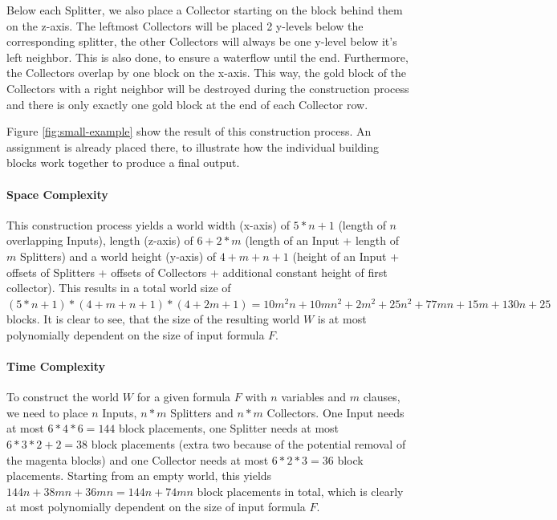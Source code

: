 \noindent Below each Splitter, we also place a Collector starting on the block behind them on the z-axis. The leftmost Collectors will be placed 2 y-levels below the corresponding splitter, the other Collectors will always be one y-level below it's left neighbor. This is also done, to ensure a waterflow until the end. Furthermore, the Collectors overlap by one block on the x-axis. This way, the gold block of the Collectors with a right neighbor will be destroyed during the construction process and there is only exactly one gold block at the end of each Collector row.
\linebreak

\noindent Figure \ref{fig:small-example} show the result of this construction process. An assignment is already placed there, to illustrate how the individual building blocks work together to produce a final output.



\paragraph{Space Complexity}
This construction process yields a world width (x-axis) of $5 * n + 1$ (length of $n$ overlapping Inputs), length (z-axis) of $6 + 2 * m$ (length of an Input + length of $m$ Splitters) and a world height (y-axis) of $4 + m + n + 1$ (height of an Input + offsets of Splitters + offsets of Collectors + additional constant height of first collector). This results in a total world size of $(5 * n + 1) * (4 + m + n + 1) * (4 + 2m + 1) = 10m^2n + 10mn^2 + 2m^2 + 25n^2 + 77mn + 15m + 130n + 25$ blocks. It is clear to see, that the size of the resulting world $W$ is at most polynomially dependent on the size of input formula $F$.



\paragraph{Time Complexity}
To construct the world $W$ for a given formula $F$ with $n$ variables and $m$ clauses, we need to place $n$ Inputs, $n * m$ Splitters and $n * m$ Collectors. One Input needs at most $6 * 4 * 6 = 144$ block placements, one Splitter needs at most $6 * 3 * 2 + 2 = 38$ block placements (extra two because of the potential removal of the magenta blocks) and one Collector needs at most $6 * 2 * 3 = 36$ block placements.
Starting from an empty world, this yields $144n + 38mn + 36mn = 144n + 74mn$ block placements in total, which is clearly at most polynomially dependent on the size of input formula $F$.


